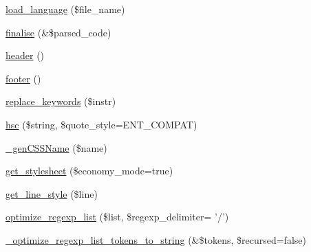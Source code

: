 \begin{DoxyCompactItemize}
\item 
\hyperlink{class_ge_s_hi_a7597671dc76f5140b3762e79d8bfd7ec}{load\-\_\-language} (\$file\-\_\-name)
\item 
\hyperlink{class_ge_s_hi_aa7421c424ab2263d49ddafd8bf34fae7}{finalise} (\&\$parsed\-\_\-code)
\item 
\hyperlink{class_ge_s_hi_a1bc16b5dd7819813f8b8ba1ba0408ccb}{header} ()
\item 
\hyperlink{class_ge_s_hi_abf47d9d66bd29da310fb40c95e21b574}{footer} ()
\item 
\hyperlink{class_ge_s_hi_a750460b89d038d36194f39445c97548f}{replace\-\_\-keywords} (\$instr)
\item 
\hyperlink{class_ge_s_hi_ac50fc0bb32bcd62ff6b65ddbb5b01c9a}{hsc} (\$string, \$quote\-\_\-style=E\-N\-T\-\_\-\-C\-O\-M\-P\-A\-T)
\item 
\hyperlink{class_ge_s_hi_a44c8c5798ec3131ba43652aaf3c7f73f}{\-\_\-gen\-C\-S\-S\-Name} (\$name)
\item 
\hyperlink{class_ge_s_hi_aefe94b23dc0fddd51756b5d48c417669}{get\-\_\-stylesheet} (\$economy\-\_\-mode=true)
\item 
\hyperlink{class_ge_s_hi_a024c45859b2135f1a022a566efea4284}{get\-\_\-line\-\_\-style} (\$line)
\item 
\hyperlink{class_ge_s_hi_ab7fb140d0dbb71262e658f98396efc98}{optimize\-\_\-regexp\-\_\-list} (\$list, \$regexp\-\_\-delimiter= '/')
\item 
\hyperlink{class_ge_s_hi_a37e07952edc33c01ee398d0193dbdd0e}{\-\_\-optimize\-\_\-regexp\-\_\-list\-\_\-tokens\-\_\-to\-\_\-string} (\&\$tokens, \$recursed=false)
\end{DoxyCompactItemize}
